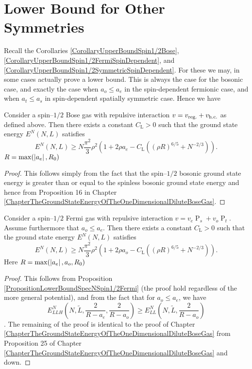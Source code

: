 \section{Lower Bound for Other Symmetries}
Recall the Corollaries \ref{CorollaryUpperBoundSpin1/2Bose}, \ref{CorollaryUpperBoundSpin1/2FermiSpinDependent}, and \ref{CorollaryUpperBoundSpin1/2SymmetricSpinDependent}. For these we may, in some cases actually prove a lower bound. This is always the case for the bosonic case, and exactly the case when $ a_o\leq a_e $ in the spin-dependent fermionic case, and when $ a_t\leq a_s $ in spin-dependent spatially symmetric case. Hence we have 
\begin{theorem}
	\label{TheoremLowerBoundSpin1/2Bose}
	Consider a spin--$ 1/2 $ Bose gas with repulsive interaction  $v=v_{\textnormal{reg.}}+v_{\textnormal{h.c.}}$ as defined above. Then there exists a constant $C_\text{L}>0$ such that the ground state energy $E^N(N,L)$ satisfies
	\begin{equation}
	\label{eqlowerSpin1/2Bose}
	E^N(N,L)\geq N\frac{\pi^2}{3}\rho^2\left(1+2\rho a_e-C_\text{L}\left((\rho R)^{6/5}+N^{-2/3}\right)\right).
	\end{equation}
	$ R=\max(\left\lvert a_e \right\rvert, R_0) $
\end{theorem}
\begin{proof}
	This follows simply from the fact that the spin--$ 1/2$ bosonic ground state energy is greater than or equal to the spinless bosonic ground state energy and hence from Proposition 16 in Chapter \ref{ChapterTheGroundStateEnergyOfTheOneDimensionalDiluteBoseGas}.
\end{proof}
	\begin{theorem}
	\label{TheoremLowerBoundSpinDependentSpin1/2Fermi}
	Consider a spin--$ 1/2 $ Fermi gas with repulsive interaction  $v=v_e\operatorname{P}_s+v_o\operatorname{P}_t$. Assume furthermore that $ a_o\leq a_e $. Then there exists a constant $C_\text{L}>0$ such that the ground state energy $E^N(N,L)$ satisfies
	\begin{equation}
	\label{eqlowerSpinDependtSpin1/2Fermi}
	E^N(N,L)\geq N\frac{\pi^2}{3}\rho^2\left(1+2\rho a_o-C_\text{L}\left((\rho R)^{6/5}+N^{-2/3}\right)\right).
	\end{equation}
	Here $ R=\max(\left\lvert a_e \right\rvert, a_o, R_0) $
\end{theorem}
\begin{proof}
	This follows from Proposition \ref{PropositionLowerBoundSpecNSpin1/2Fermi} (the proof hold regardless of the more general potential), and from the fact that for $ a_o\leq a_e $, we have $$ E_{LLH}^N\left(N,\tilde{L},\frac{2}{R-a_e},\frac{2}{R-a_o}\right)\geq E^N_{LL}\left(N,\tilde{L},\frac{2}{R-a_o}\right) $$. The remaining of the proof is identical to the proof of Chapter \ref{ChapterTheGroundStateEnergyOfTheOneDimensionalDiluteBoseGas} from Proposition 25 of Chapter \ref{ChapterTheGroundStateEnergyOfTheOneDimensionalDiluteBoseGas} and down.
\end{proof}
